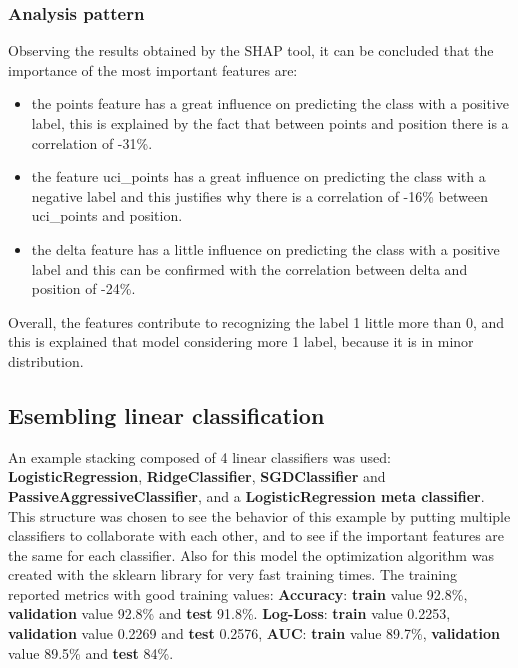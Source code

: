 \documentclass[a4paper, twoside]{article}
\begin{document}
\subsubsection{Analysis pattern}

Observing the results obtained by the SHAP tool, it can be concluded that the importance of the most important features are:

\begin{itemize}[noitemsep]
    
    \item  the points feature has a great influence on predicting the class with a positive label, this is explained by the fact that between points and position there is a correlation of -31\%.
    \item  the feature uci\_points has a great influence on predicting the class with a negative label and this justifies why there is a correlation of -16\% between uci\_points and position.
    \item  the delta feature has a little influence on predicting the class with a positive label and this can be confirmed with the correlation between delta and position of -24\%.

\end{itemize}



Overall, the features contribute to recognizing the label 1 little more than 0, and this is explained that model considering more 1 label, because it is in minor distribution.

\subsection{Esembling linear classification}

An example stacking composed of 4 linear classifiers was used: \textbf{LogisticRegression}, \textbf{RidgeClassifier}, \textbf{SGDClassifier} and \textbf{PassiveAggressiveClassifier}, and a \textbf{LogisticRegression meta classifier}. This structure was chosen to see the behavior of this example by putting multiple classifiers to collaborate with each other, and to see if the important features are the same for each classifier. Also for this model the optimization algorithm was created with the sklearn library for very fast training times. The training reported metrics with good training values: \textbf{Accuracy}: \textbf{train} value 92.8\%, \textbf{validation} value 92.8\% and \textbf{test} 91.8\%. \textbf{Log-Loss}: \textbf{train} value 0.2253, \textbf{validation} value 0.2269 and \textbf{test} 0.2576, \textbf{AUC}: \textbf{train} value 89.7\%, \textbf{validation} value 89.5\% and \textbf{test} 84\%.
\end{document}
